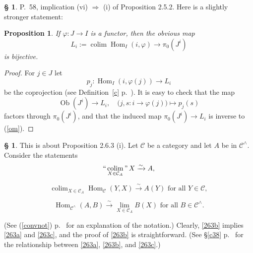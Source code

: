\documentclass[12pt]{article}%
\newtheorem{prop}[thm]{Proposition}
\theoremstyle{remark}
\theoremstyle{definition}
\newtheorem{s}[thm]{\S}%
\newcommand{\C}{\mathcal C}
\newcommand{\then}{\Rightarrow}
\DeclareMathOperator*{\colim}{colim}
\DeclareMathOperator*{\ic}{``\colim"}
\DeclareMathOperator{\Hom}{Hom}%
\DeclareMathOperator{\Ob}{Ob}
\begin{document}
%

\begin{s} 
P.~58, implication (vi) $\then$ (i) of Proposition 2.5.2. Here is a slightly stronger statement:
%
\begin{prop} 
If $\varphi:J\to I$ is a functor, then the obvious map
\begin{equation}\label{om}
L_i:=\colim\Hom_I(i,\varphi)\to\pi_0(J^i)
\end{equation}
is bijective. 
\end{prop}
% 
\begin{proof}
For $j\in J$ let 
$$
p_j:\Hom_I(i,\varphi(j))\to L_i
$$
be the coprojection (see Definition~\ref{c} p.~\pageref{c}). It is easy to check that the map 
$$
\Ob(J^i)\to L_i,\quad\big(j,s:i\to\varphi(j)\big)\mapsto p_j(s)
$$
factors through $\pi_0(J^i)$, and that the induced map $\pi_0(J^i)\to L_i$ is inverse to (\ref{om}).
\end{proof}
\end{s}

%


\begin{s}
This is about Proposition 2.6.3 (i). Let $\C$ be a category and let $A$ be in $\C^\wedge$. Consider the statements
%
\begin{equation}\label{263a}
\ic_{X\in\C_A}X\xrightarrow\sim A,
\end{equation} 

\begin{equation}\label{263b}
\colim_{X\in\C_A}\Hom_\C(Y,X)\xrightarrow\sim A(Y)\text{ for all }Y\in\C, 
\end{equation}

\begin{equation}\label{263c}
\Hom_{\C^\wedge}(A,B)\xrightarrow\sim\lim_{X\in\C_A}B(X)\text{ for all }B\in\C^\wedge. 
\end{equation}

\noindent(See (\ref{convnot}) p.~\pageref{convnot} for an explanation of the notation.) Clearly, \eqref{263b} implies \eqref{263a} and \eqref{263c}, and the proof of \eqref{263b} is straightforward. (See \S\ref{c38} p.~\pageref{c38} for the relationship between \eqref{263a}, \eqref{263b}, and \eqref{263c}.)
\end{s}
\end{document}
